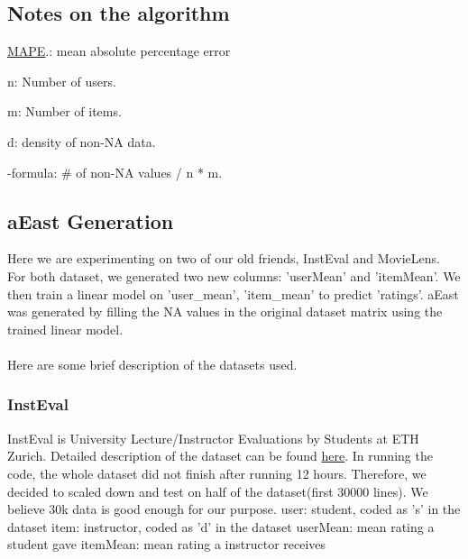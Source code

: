 \documentclass[12pt]{article}
\begin{document}
\subsection{Notes on the algorithm}
 
\href{https://en.wikipedia.org/wiki/Mean_absolute_percentage_error}{MAPE}.: mean absolute percentage error 
 
n: Number of users.
 
m: Number of items.
 
d: density of non-NA data. 
    
-formula: \# of non-NA values / n * m.

\subsection{aEast Generation}
Here we are experimenting on two of our old friends, InstEval and MovieLens. For both dataset, we generated two new columns: 'userMean' and 'itemMean'. We then train a linear model on 'user\_mean', 'item\_mean' to predict 'ratings'. aEast was generated by filling the NA values in the original dataset matrix using the trained linear model. 
\\
\\
Here are some brief description of the datasets used. 
\subsubsection{InstEval}
InstEval is University Lecture/Instructor Evaluations by Students at ETH Zurich. Detailed description of the dataset can be found \href{https://rdrr.io/cran/lme4/man/InstEval.html}{here}.
\newline \newline
In running the code, the whole dataset did not finish after running 12 hours. Therefore, we decided to scaled down and test on half of the dataset(first 30000 lines). We believe 30k data is good enough for our purpose. 
\newline \newline
user: student, coded as 's' in the dataset
\newline
item: instructor, coded as 'd' in the dataset
\newline
userMean: mean rating a student gave
\newline
itemMean: mean rating a instructor receives
\end{document}
